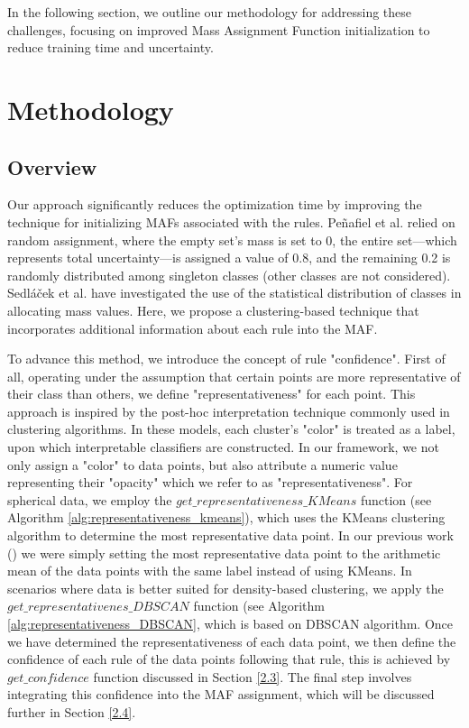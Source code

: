 \documentclass[10pt,a4paper,oneside]{article}
\begin{document}
{\color{red}In the following section, we outline our methodology for addressing these challenges, focusing on improved Mass Assignment Function initialization to reduce training time and uncertainty.}
\section{Methodology}\label{1.2}
\subsection{Overview}\label{1.2.2}
Our approach significantly reduces the optimization time by improving the technique for initializing MAFs associated with the rules. Peñafiel et al. \cite{sergio} relied on random assignment, where the empty set's mass is set to 0, the entire set—which represents total uncertainty—is assigned a value of 0.8, and the remaining 0.2 is randomly distributed among singleton classes (other classes are not considered). {\color{black} Sedláček et al. \cite{czechs} have investigated the use of the statistical distribution of classes in allocating mass values}. Here{\color{black},} we propose a {\color{black} clustering-based} technique that incorporates additional information about each rule into the MAF. 

To advance this method, we introduce the concept of rule "confidence". First of all, operating under the assumption that certain points are more representative of their class than others{\color{black},} we define "representativeness" for each point. This approach is inspired by the post-hoc interpretation technique commonly used in clustering algorithms. In these models, each cluster's "color" is treated as a label, upon which interpretable classifiers are constructed. In our framework, we not only assign a "color" to data points{\color{black},} but also attribute a numeric value representing their "opacity" which we refer to as "representativeness". For spherical data, we employ the $get\_representativeness\_KMeans$ function (see Algorithm \ref{alg:representativeness_kmeans}), which uses the KMeans clustering algorithm \cite{kmeans} to determine the most representative data point. {\color{black}In our previous work (\cite{menq}) we were simply setting the most representative data point to the arithmetic mean of the data points with the same label instead of using KMeans.} In scenarios where data is better suited for density-based clustering, we apply the $get\_representativenes\_DBSCAN$ function (see Algorithm \ref{alg:representativeness_DBSCAN}, {\color{black}which is based on DBSCAN \cite{DBSCAN} algorithm.} Once we have determined the representativeness of each data point, we then define the confidence of each rule of the data points following that rule, this is achieved by $get\_confidence$ function discussed in Section \ref{2.3}. The final step involves integrating this confidence into the MAF assignment, which will be discussed further in Section \ref{2.4}.
\end{document}
